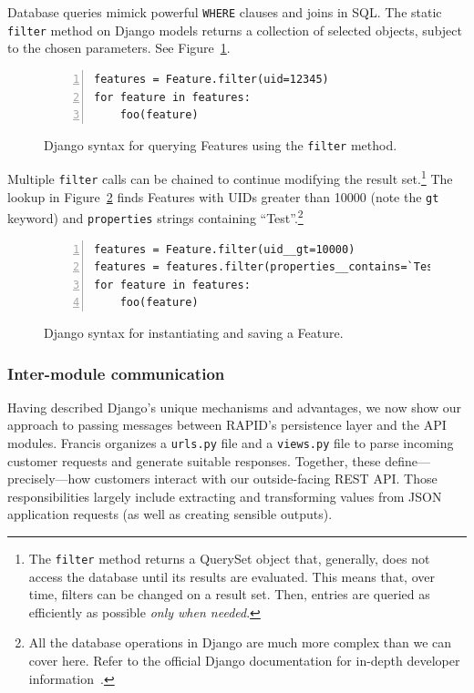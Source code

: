 Database queries mimick powerful \texttt{WHERE} clauses and joins in SQL. The static \texttt{filter} method on Django models returns a collection of selected objects, subject to the chosen parameters. See Figure~\ref{fig:filter1}.

\begin{figure}[ht]
\begin{Verbatim}[samepage=true,baselinestretch=1,numbers=left,xleftmargin=12mm]
features = Feature.filter(uid=12345)
for feature in features:
    foo(feature)
\end{Verbatim}
\caption{Django syntax for querying Features using the \texttt{filter} method.}
\label{fig:filter1}
\end{figure}

Multiple \texttt{filter} calls can be chained to continue modifying the result set.\footnote{The \texttt{filter} method returns a QuerySet object that, generally, does not access the database until its results are evaluated. This means that, over time, filters can be changed on a result set. Then, entries are queried as efficiently as possible \textit{only when needed}.} The lookup in Figure~\ref{fig:filter2} finds Features with UIDs greater than 10000 (note the \texttt{gt} keyword) and \texttt{properties} strings containing ``Test''.\footnote{All the database operations in Django are much more complex than we can cover here. Refer to the official Django documentation for in-depth developer information~\cite{GeoDb}.}

\begin{figure}[ht]
\begin{Verbatim}[samepage=true,baselinestretch=1,numbers=left,xleftmargin=12mm]
features = Feature.filter(uid__gt=10000)
features = features.filter(properties__contains=`Test')
for feature in features:
    foo(feature)
\end{Verbatim}
\caption{Django syntax for instantiating and saving a Feature.}
\label{fig:filter2}
\end{figure}

\subsubsection{Inter-module communication}
Having described Django's unique mechanisms and advantages, we now show our approach to passing messages between RAPID's persistence layer and the API modules. Francis organizes a \texttt{urls.py} file and a \texttt{views.py} file to parse incoming customer requests and generate suitable responses. Together, these define---precisely---how customers interact with our outside-facing REST API. Those responsibilities largely include extracting and transforming values from JSON application requests (as well as creating sensible outputs).

